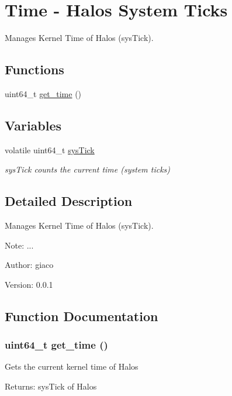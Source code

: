 \hypertarget{group___t_i_m_e}{
\section{Time - Halos System Ticks}
\label{group___t_i_m_e}
}
Manages Kernel Time of Halos (sysTick).  


\subsection*{Functions}
\begin{CompactItemize}
\item 
uint64\_\-t \hyperlink{group___t_i_m_e_g13abe410ceba31fb3039098f5ebb9bf5}{get\_\-time} ()
\end{CompactItemize}
\subsection*{Variables}
\begin{CompactItemize}
\item 
\hypertarget{group___t_i_m_e_g8b740eac1e4ec70aa17b71fbd26e62dc}{
volatile uint64\_\-t \hyperlink{group___t_i_m_e_g8b740eac1e4ec70aa17b71fbd26e62dc}{sysTick}}
\label{group___t_i_m_e_g8b740eac1e4ec70aa17b71fbd26e62dc}

\begin{CompactList}\small\item\em sysTick counts the current time (system ticks) \item\end{CompactList}\end{CompactItemize}


\subsection{Detailed Description}
Manages Kernel Time of Halos (sysTick). 

\begin{Desc}
\item[Note:]... \end{Desc}
\begin{Desc}
\item[Author:]giaco \end{Desc}
\begin{Desc}
\item[Version:]0.0.1 \end{Desc}


\subsection{Function Documentation}
\hypertarget{group___t_i_m_e_g13abe410ceba31fb3039098f5ebb9bf5}{
\subsubsection[{get\_\-time}]{\setlength{\rightskip}{0pt plus 5cm}uint64\_\-t get\_\-time ()}}
\label{group___t_i_m_e_g13abe410ceba31fb3039098f5ebb9bf5}


Gets the current kernel time of Halos \begin{Desc}
\item[Returns:]sysTick of Halos \end{Desc}
